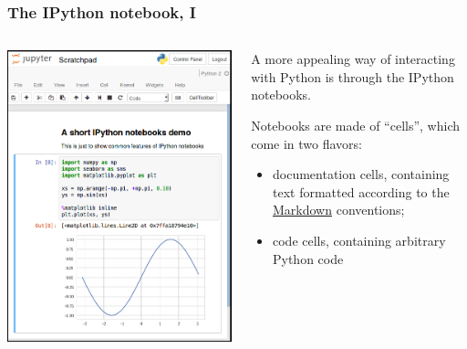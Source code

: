 \documentclass[english,serif,mathserif,xcolor=pdftex,dvipsnames,table]{beamer}
\begin{document}
\begin{frame}
  \frametitle{The IPython notebook, I}

  \begin{columns}[t]
    \begin{column}{0.5\textwidth}
      \begin{center}
        \includegraphics[width=1.00\linewidth]{fig/nb.png}
      \end{center}
    \end{column}
    \begin{column}{0.5\textwidth}
      \small

      A more appealing way of interacting with Python is through the IPython
      notebooks.

      \+
      Notebooks are made of ``cells'', which come in two flavors:
      \begin{itemize}
      \item documentation cells, containing text formatted according to the
        \href{http://commonmark.org/help/}{Markdown} conventions;
      \item code cells, containing arbitrary Python code
      \end{itemize}
    \end{column}
  \end{columns}
\end{frame}
\end{document}
